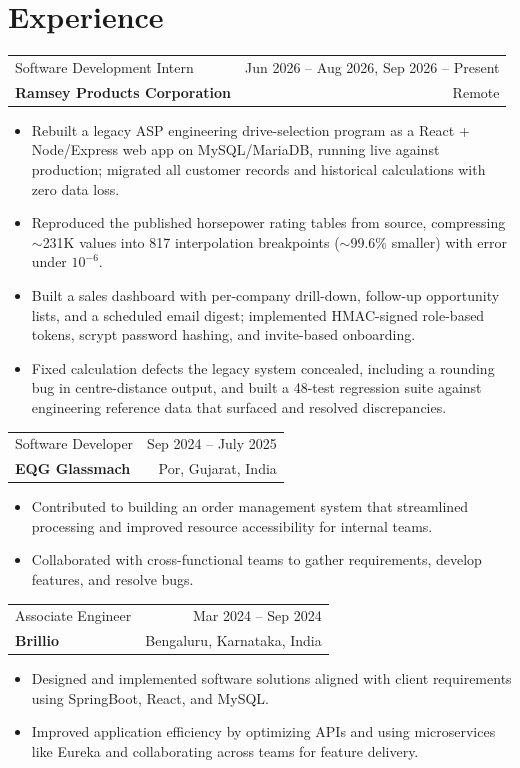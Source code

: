 \documentclass[10pt,letterpaper]{article}
\makeatletter
\newcommand{\entry}[4]{%
  \begin{tabularx}{\textwidth}{@{}X r@{}}
    #1 & #2 \\
    \textbf{#3} & #4 \\
  \end{tabularx}\vspace{-1pt}}
\makeatother
\begin{document}
\section*{Experience}
\entry{Software Development Intern}{Jun 2026 -- Aug 2026, Sep 2026 -- Present}{Ramsey Products Corporation}{Remote}
\begin{itemize}
  \item Rebuilt a legacy ASP engineering drive-selection program as a React + Node/Express web app on MySQL/MariaDB,
        running live against production; migrated all customer records and historical calculations with zero data loss.
  \item Reproduced the published horsepower rating tables from source, compressing $\sim$231K values into 817
        interpolation breakpoints ($\sim$99.6\% smaller) with error under $10^{-6}$.
  \item Built a sales dashboard with per-company drill-down, follow-up opportunity lists, and a scheduled email digest;
        implemented HMAC-signed role-based tokens, scrypt password hashing, and invite-based onboarding.
  \item Fixed calculation defects the legacy system concealed, including a rounding bug in centre-distance output, and built
        a 48-test regression suite against engineering reference data that surfaced and resolved discrepancies.
\end{itemize}

\entry{Software Developer}{Sep 2024 -- July 2025}{EQG Glassmach}{Por, Gujarat, India}
\begin{itemize}
  \item Contributed to building an order management system that streamlined processing and improved resource accessibility
        for internal teams.
  \item Collaborated with cross-functional teams to gather requirements, develop features, and resolve bugs.
\end{itemize}

\entry{Associate Engineer}{Mar 2024 -- Sep 2024}{Brillio}{Bengaluru, Karnataka, India}
\begin{itemize}
  \item Designed and implemented software solutions aligned with client requirements using SpringBoot, React, and MySQL.
  \item Improved application efficiency by optimizing APIs and using microservices like Eureka and collaborating across teams
        for feature delivery.
\end{itemize}
\end{document}
